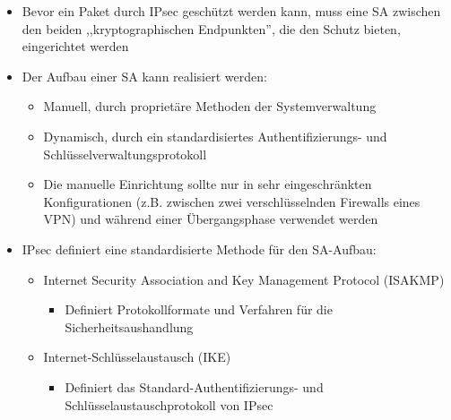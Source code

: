 \documentclass[a4paper]{article}
\begin{document}
\begin{multicols}{3}
    \begin{itemize}
        \item
              Bevor ein Paket durch IPsec geschützt werden kann, muss eine SA
              zwischen den beiden ,,kryptographischen Endpunkten'', die den Schutz
              bieten, eingerichtet werden
        \item
              Der Aufbau einer SA kann realisiert werden:

              \begin{itemize}
                  \item
                        Manuell, durch proprietäre Methoden der Systemverwaltung
                  \item
                        Dynamisch, durch ein standardisiertes Authentifizierungs- und
                        Schlüsselverwaltungsprotokoll
                  \item
                        Die manuelle Einrichtung sollte nur in sehr eingeschränkten
                        Konfigurationen (z.B. zwischen zwei verschlüsselnden Firewalls eines
                        VPN) und während einer Übergangsphase verwendet werden
              \end{itemize}
        \item
              IPsec definiert eine standardisierte Methode für den SA-Aufbau:

              \begin{itemize}
                  \item
                        Internet Security Association and Key Management Protocol (ISAKMP)

                        \begin{itemize}
                            \item
                                  Definiert Protokollformate und Verfahren für die
                                  Sicherheitsaushandlung
                        \end{itemize}
                  \item
                        Internet-Schlüsselaustausch (IKE)

                        \begin{itemize}
                            \item
                                  Definiert das Standard-Authentifizierungs- und
                                  Schlüsselaustauschprotokoll von IPsec
                        \end{itemize}
              \end{itemize}
    \end{itemize}



\end{multicols}
\end{document}
